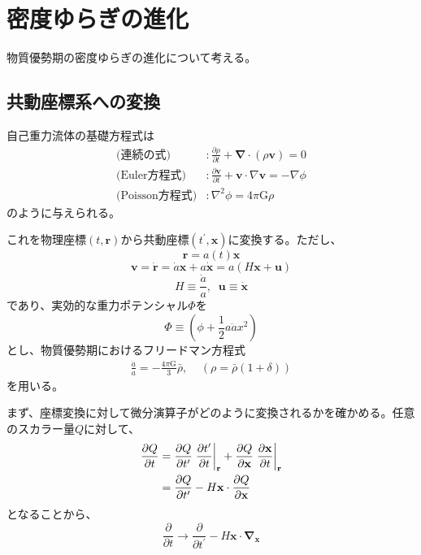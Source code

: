 \documentclass[a4paper,papersize,uplatex,dvipdfmx,10pt]{jsarticle}
\begin{document}
\section{密度ゆらぎの進化}
物質優勢期の密度ゆらぎの進化について考える。
\subsection{共動座標系への変換}
自己重力流体の基礎方程式は
\begin{align}
  \text{(連続の式)}&:\frac{\partial \rho}{\partial t}+\bm{\nabla}\cdot\left( \rho \mathbf{v} \right)=0 \label{renzoku}\\
  \text{(Euler方程式)}&:\frac{\partial \mathbf{v}}{\partial t}+\mathbf{v}\cdot\nabla\mathbf{v}=-\nabla \phi \label{euler}\\
  \text{(Poisson方程式)}&:\nabla^{2}\phi = 4\pi\mathrm{G}\rho \label{poisson}
\end{align}
のように与えられる。

これを物理座標$(t,\mathbf{r})$から共動座標$(t^{\prime},\mathbf{x})$に変換する。ただし、
\begin{equation}
  \mathbf{r} = a(t)\mathbf{x}
\end{equation}
\begin{equation}
  \mathbf{v}=\dot{\mathbf{r}}=\dot{a}\mathbf{x}+a\dot{\mathbf{x}}=a\left( H\mathbf{x}+\mathbf{u} \right)
\end{equation}
\begin{equation}
  H \equiv \frac{\dot{a}}{a},\mspace{10mu}\mathbf{u}\equiv\dot{\mathbf{x}}
\end{equation}
であり、実効的な重力ポテンシャル$\Phi$を
\begin{equation}
  \Phi \equiv \left( \phi + \frac{1}{2}a\ddot{a}x^{2} \right)
\end{equation}
とし、物質優勢期におけるフリードマン方程式
\begin{align}
  \frac{\ddot{a}}{a} = -\frac{4\pi\mathrm{G}}{3}\bar{\rho},\mspace{20mu}(\rho=\bar{\rho}(1+\delta))
\end{align}
を用いる。

まず、座標変換に対して微分演算子がどのように変換されるかを確かめる。任意のスカラー量$Q$に対して、
\begin{align}
  \frac{\partial Q}{\partial t} &= \frac{\partial Q}{\partial t^{\prime}}\left.\frac{\partial t^{\prime}}{\partial t}\right|_{\mathbf{r}} + \frac{\partial Q}{\partial \mathbf{x}}\left.\frac{\partial \mathbf{x}}{\partial t}\right|_{\mathbf{r}}\notag\\
  &= \frac{\partial Q}{\partial t^{\prime}} - H\mathbf{x}\cdot\frac{\partial Q}{\partial \mathbf{x}}
\end{align}
となることから、
\begin{equation}
  \frac{\partial}{\partial t} \to \frac{\partial}{\partial t^{\prime}} - H\mathbf{x}\cdot\bm{\nabla}_{\mathbf{x}}
\end{equation}
\end{document}
